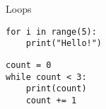 \begin{frame}[fragile]{Loops}
	\begin{lstlisting}
for i in range(5):
    print("Hello!")
    \end{lstlisting}

	\begin{lstlisting}
count = 0
while count < 3:
    print(count)
    count += 1
    \end{lstlisting}
\end{frame}